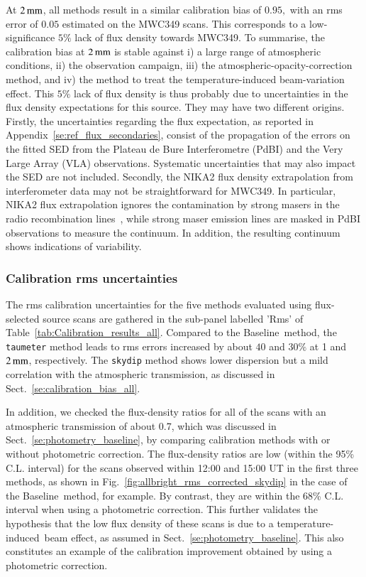 \documentclass[traditionalabstract]{aa}
\newcommand{\afternoon}{temperature-induced}
\newcommand{\baseline}{Baseline}%
\newcommand{\lp}[1]{#1}
\begin{document}
{At $2\,\rm{mm}$, all methods result in a similar calibration bias
of $0.95,$ with an rms error of $0.05$ estimated on the MWC349 scans. 
This corresponds to a low-significance $5\%$ lack of flux density
towards MWC349.
To summarise, the calibration bias at $2\, \rm{mm}$ is stable against
i) a large range of atmospheric conditions, ii) the observation campaign, iii) the
atmospheric-opacity-correction method, and iv) the method to treat the
temperature-induced beam-variation effect.
This $5\%$ lack of flux density is thus probably due to
uncertainties in the flux density expectations for this source.
They may have two different origins.
{\lp Firstly, the uncertainties regarding the flux expectation, as reported in
Appendix~\ref{se:ref_flux_secondaries}, consist of the propagation of
the errors on the fitted SED from the Plateau de Bure Interferometre
(PdBI) and the Very Large Array (VLA) observations. Systematic
uncertainties that may also impact the SED are not included.}  
Secondly, the NIKA2 flux density extrapolation from
interferometer data may not be straightforward for MWC349. {\lp In
particular, NIKA2 flux extrapolation ignores the contamination by
strong masers in the radio recombination lines~\citep{masingRRL},
while strong maser emission lines are masked in PdBI observations to
measure the continuum. In addition, the resulting continuum shows
indications of variability.}


\subsubsection{Calibration rms uncertainties}

The rms calibration uncertainties for the five methods evaluated using
flux-selected source scans are gathered in the sub-panel labelled 'Rms'
of Table~\ref{tab:Calibration_results_all}.
Compared to the \baseline\ method, the {\tt taumeter} method leads to 
rms errors increased by about $40$ and $30\%$ at 1 and
$2\,\rm{mm}$, respectively. The {\tt skydip} method shows lower
dispersion but a mild correlation with the atmospheric transmission, as
discussed in Sect.~\ref{se:calibration_bias_all}.

In addition, we checked the flux-density ratios for all of the
scans with an atmospheric transmission of about 0.7, which was
discussed in Sect.~\ref{se:photometry_baseline}, by comparing
calibration methods with or without photometric correction. The
flux-density ratios are low (within the 95\% C.L. interval) for the scans
observed within 12:00 and 15:00 UT in the first three methods, as shown in
Fig.~\ref{fig:allbright_rms_corrected_skydip} in the case of the \baseline\ method, for example. By contrast, they are within the 68\% C.L. interval
when using a photometric correction. This further validates the
hypothesis that the low flux
density of these scans is due to a \afternoon\ beam effect, as assumed in
Sect.~\ref{se:photometry_baseline}. This also constitutes an example
of the calibration improvement obtained by using a
photometric correction.

}
\end{document}
